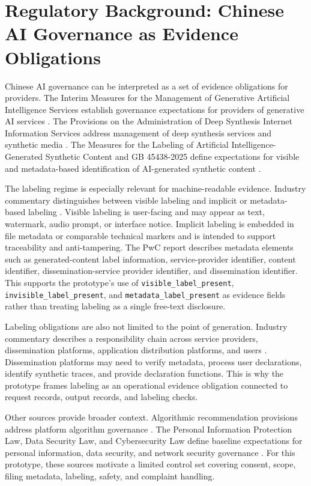 \documentclass[10pt,journal]{IEEEtran}
\begin{document}
\section{Regulatory Background: Chinese AI Governance as Evidence Obligations}

Chinese AI governance can be interpreted as a set of evidence obligations for providers. The Interim Measures for the Management of Generative Artificial Intelligence Services establish governance expectations for providers of generative AI services \cite{cac2023generativeai}. The Provisions on the Administration of Deep Synthesis Internet Information Services address management of deep synthesis services and synthetic media \cite{cac2022deepsynthesis}. The Measures for the Labeling of Artificial Intelligence-Generated Synthetic Content and GB 45438-2025 define expectations for visible and metadata-based identification of AI-generated synthetic content \cite{cac2025labeling,gb45438}.

The labeling regime is especially relevant for machine-readable evidence. Industry commentary distinguishes between visible labeling and implicit or metadata-based labeling \cite{pwc2025aigclabeling}. Visible labeling is user-facing and may appear as text, watermark, audio prompt, or interface notice. Implicit labeling is embedded in file metadata or comparable technical markers and is intended to support traceability and anti-tampering. The PwC report describes metadata elements such as generated-content label information, service-provider identifier, content identifier, dissemination-service provider identifier, and dissemination identifier. This supports the prototype's use of \texttt{visible\_label\_present}, \texttt{invisible\_label\_present}, and \texttt{metadata\_label\_present} as evidence fields rather than treating labeling as a single free-text disclosure.

Labeling obligations are also not limited to the point of generation. Industry commentary describes a responsibility chain across service providers, dissemination platforms, application distribution platforms, and users \cite{pwc2025aigclabeling}. Dissemination platforms may need to verify metadata, process user declarations, identify synthetic traces, and provide declaration functions. This is why the prototype frames labeling as an operational evidence obligation connected to request records, output records, and labeling checks.

Other sources provide broader context. Algorithmic recommendation provisions address platform algorithm governance \cite{cac2022algorithmic}. The Personal Information Protection Law, Data Security Law, and Cybersecurity Law define baseline expectations for personal information, data security, and network security governance \cite{pipl2021,dsl2021,csl2017}. For this prototype, these sources motivate a limited control set covering consent, scope, filing metadata, labeling, safety, and complaint handling.
\end{document}
